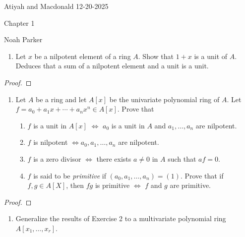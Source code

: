 \documentclass[12pt]{amsart}
\begin{document}
{Atiyah and Macdonald} \hfill {12-20-2025}

\bigskip\bigskip

\begin{center}

{\sc Chapter 1}

\end{center}

\begin{center}

  {Noah Parker} %
    
\end{center}

\bigskip

\begin{enumerate}
	\item[1.] {
      Let $x$ be a nilpotent element of a ring $A$.
      Show that $1+x$ is a unit of $A$.
      Deduces that a sum of a nilpotent element and a unit is a unit.
    }
\end{enumerate}

\begin{proof}
\end{proof}

\begin{enumerate}
	\item[2.] {
      Let $A$ be a ring and let $A[x]$ be the univariate polynomial ring of $A$.
      Let $f=a_0 + a_1x + \cdots + a_nx^n\in A[x]$.
      Prove that
      \begin{enumerate}
        \item $f$ is a unit in $A[x]$ $\iff$ $a_0$ is a unit in $A$ and $a_1,\ldots, a_n$ are nilpotent.
        \item $f$ is nilpotent $\iff a_0,a_1,\ldots, a_n$ are nilpotent.
        \item $f$ is a zero divisor $\iff$ there exists $a\neq 0$ in $A$ such that $af=0$.
        \item $f$ is said to be \emph{primitive} if $(a_0,a_1,\ldots,a_n)=(1)$.
          Prove that if $f,g\in A[X]$, then $fg$ is primitive $\iff$ $f$ and $g$ are primitive.
      \end{enumerate}
    }
\end{enumerate}

\begin{proof}
\end{proof}

\begin{enumerate}
	\item[3.] {
      Generalize the results of Exercise 2 to a multivariate polynomial ring $A[x_1,\ldots, x_r]$.
    }
\end{enumerate}
\end{document}
